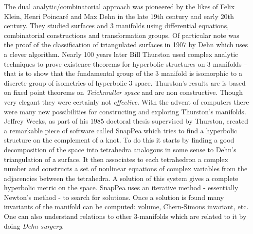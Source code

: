 \documentclass[14pt,fleqn]{article}
\begin{document}
The dual analytic/combinatorial approach was pioneered by the likes of Felix Klein, Henri Poincaré and Max Dehn in the late 19th century and early 20th century.
They studied surfaces
 and 3  manifolds using  
differential equations,
combinatorial constructions
and transformation groups.
Of particular note was the proof of  the classification of triangulated surfaces in 1907 by Dehn which uses a clever algorithm. 
Nearly 100 years later Bill Thurston
used complex analytic techniques to prove
existence theorems 
for hyperbolic structures on 3 manifolds
\cite{Thu1}
-- that is to show that the fundamental group of the 3 manifold is isomorphic
to a discrete group of isometries of 
hyperbolic 3 space.
Thurston's results are 
is based on fixed point 
theorems on \textit{Teichmuller space}
and are non constructive.
Though very elegant 
they were certainly not \textit{effective}.
With the advent of computers 
there were many new possibilities
for constructing and exploring Thurston's manifolds.
Jeffrey Weeks,  as part of his 1985 doctoral thesis
supervised by Thurston,
created a remarkable piece of software called SnapPea which tries to find a
hyperbolic structure on the complement of a knot.
To do this it starts  by finding a good  decomposition of the  space into tetrahedra analogous in some sense 
to Dehn's triangulation of a surface.
It then associates to each tetrahedron a complex number 
and constructs a
set of nonlinear equations of complex variables from the adjacencies between the tetrahedra.
A solution of this system  gives a complete hyperbolic metric on the space.
SnapPea  uses an iterative method -  essentially Newton's method - to search for solutions. 
Once a solution is found many 
invariants of the manifold can be computed: volume, Chern-Simons invariant, etc.
One can also understand relations to other 3-manifolds which are related to it 
 by doing \textit{Dehn surgery}.
\end{document}
